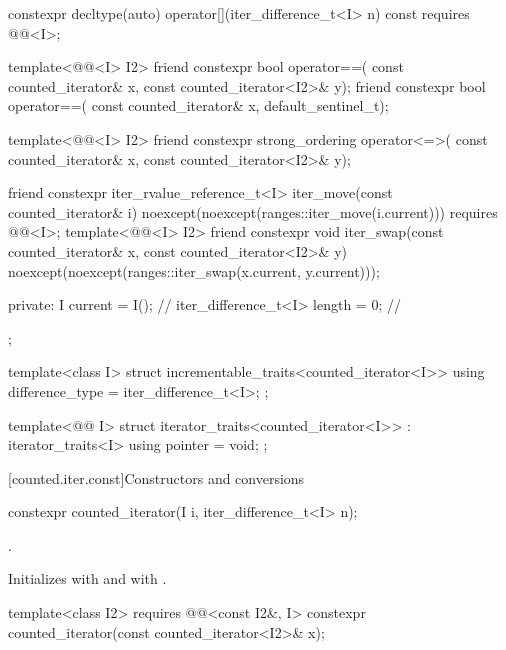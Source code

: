 \begin{codeblock}
{{    constexpr decltype(auto) operator[](iter_difference_t<I> n) const
      requires @@<I>;

    template<@@<I> I2>
      friend constexpr bool operator==(
        const counted_iterator& x, const counted_iterator<I2>& y);
    friend constexpr bool operator==(
      const counted_iterator& x, default_sentinel_t);

    template<@@<I> I2>
      friend constexpr strong_ordering operator<=>(
        const counted_iterator& x, const counted_iterator<I2>& y);

    friend constexpr iter_rvalue_reference_t<I> iter_move(const counted_iterator& i)
      noexcept(noexcept(ranges::iter_move(i.current)))
        requires @@<I>;
    template<@@<I> I2>
      friend constexpr void iter_swap(const counted_iterator& x, const counted_iterator<I2>& y)
        noexcept(noexcept(ranges::iter_swap(x.current, y.current)));

  private:
    I current = I();                    // \expos
    iter_difference_t<I> length = 0;    // \expos
  };

  template<class I>
  struct incrementable_traits<counted_iterator<I>> {
    using difference_type = iter_difference_t<I>;
  };

  template<@@ I>
  struct iterator_traits<counted_iterator<I>> : iterator_traits<I> {
    using pointer = void;
  };
}
\end{codeblock}

[counted.iter.const]{Constructors and conversions}

%
\begin{itemdecl}
constexpr counted_iterator(I i, iter_difference_t<I> n);
\end{itemdecl}

\begin{itemdescr}
\pnum
\expects
{}.

\pnum
\effects
Initializes  with  and
 with .
\end{itemdescr}

%
\begin{itemdecl}
template<class I2>
  requires @@<const I2&, I>
    constexpr counted_iterator(const counted_iterator<I2>& x);
\end{itemdecl}

